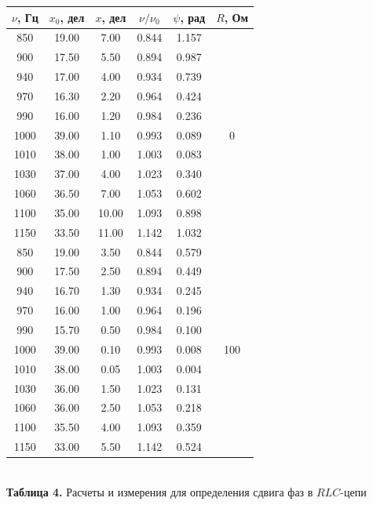 \documentclass[a4paper,12pt]{article} %
\begin{document}
\begin{center}
\begin{tabular}{|c|c|c|c|c|c|}\hline
$ \nu $, Гц & $ x_{0} $, дел & $ x $, дел & $ \nu/\nu_{0} $ & $ \psi $, рад & $ R $, Ом\\\hline
850 & 19.00 & 7.00 & 0.844 & 1.157 & \multirow{11}{*}{0} \\\cline{1 -5}
900 & 17.50 & 5.50 & 0.894 & 0.987 & \multirow{11}{*}{} \\\cline{1 -5}
940 & 17.00 & 4.00 & 0.934 & 0.739 & \multirow{11}{*}{} \\\cline{1 -5}
970 & 16.30 & 2.20 & 0.964 & 0.424 & \multirow{11}{*}{} \\\cline{1 -5}
990 & 16.00 & 1.20 & 0.984 & 0.236 & \multirow{11}{*}{} \\\cline{1 -5}
1000 & 39.00 & 1.10 & 0.993 & 0.089 & \multirow{11}{*}{} \\\cline{1 -5}
1010 & 38.00 & 1.00 & 1.003 & 0.083 & \multirow{11}{*}{} \\\cline{1 -5}
1030 & 37.00 & 4.00 & 1.023 & 0.340 & \multirow{11}{*}{} \\\cline{1 -5}
1060 & 36.50 & 7.00 & 1.053 & 0.602 & \multirow{11}{*}{} \\\cline{1 -5}
1100 & 35.00 & 10.00 & 1.093 & 0.898 & \multirow{11}{*}{} \\\cline{1 -5}
1150 & 33.50 & 11.00 & 1.142 & 1.032 & \multirow{11}{*}{} \\\hline
850 & 19.00 & 3.50 & 0.844 & 0.579 & \multirow{11}{*}{100} \\\cline{1 -5}
900 & 17.50 & 2.50 & 0.894 & 0.449 & \multirow{11}{*}{} \\\cline{1 -5}
940 & 16.70 & 1.30 & 0.934 & 0.245 & \multirow{11}{*}{} \\\cline{1 -5}
970 & 16.00 & 1.00 & 0.964 & 0.196 & \multirow{11}{*}{} \\\cline{1 -5}
990 & 15.70 & 0.50 & 0.984 & 0.100 & \multirow{11}{*}{} \\\cline{1 -5}
1000 & 39.00 & 0.10 & 0.993 & 0.008 & \multirow{11}{*}{} \\\cline{1 -5}
1010 & 38.00 & 0.05 & 1.003 & 0.004 & \multirow{11}{*}{} \\\cline{1 -5}
1030 & 36.00 & 1.50 & 1.023 & 0.131 & \multirow{11}{*}{} \\\cline{1 -5}
1060 & 36.00 & 2.50 & 1.053 & 0.218 & \multirow{11}{*}{} \\\cline{1 -5}
1100 & 35.50 & 4.00 & 1.093 & 0.359 & \multirow{11}{*}{} \\\cline{1 -5}
1150 & 33.00 & 5.50 & 1.142 & 0.524 & \multirow{11}{*}{} \\\hline
\end{tabular} \\
\hfill \break \textbf {Таблица 4.} Расчеты и измерения для определения сдвига фаз в $RLC$-цепи\\
\end{center}
\end{document}
